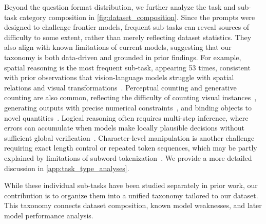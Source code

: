 Beyond the question format distribution, we further analyze the task and sub-task category composition in \autoref{fig:dataset_composition}. Since the prompts were designed to challenge frontier models, frequent sub-tasks can reveal sources of difficulty to some extent, rather than merely reflecting dataset statistics. They also align with known limitations of current models, suggesting that our taxonomy is both data-driven and grounded in prior findings. For example, spatial reasoning is the most frequent sub-task, appearing 53 times, consistent with prior observations that vision-language models struggle with spatial relations and visual transformations~\cite{stogiannidis2025mind,zhangvision}. Perceptual counting and generative counting are also common, reflecting the difficulty of counting visual instances~\cite{lvlm-count}, generating outputs with precise numerical constraints~\cite{binyamin2025make}, and binding objects to novel quantities~\cite{wiedemer2023compositional}. Logical reasoning often requires multi-step inference, where errors can accumulate when models make locally plausible decisions without sufficient global verification~\cite{saparov2022language}. Character-level manipulation is another challenge requiring exact length control or repeated token sequences, which may be partly explained by limitations of subword tokenization~\cite{zhang2024counting,fu2024large}. We provide a more detailed discussion in \autoref{app:task_type_analyses}.

While these individual sub-tasks have been studied separately in prior work, our contribution is to organize them into a unified taxonomy tailored to our dataset. This taxonomy connects dataset composition, known model weaknesses, and later model performance analysis.





